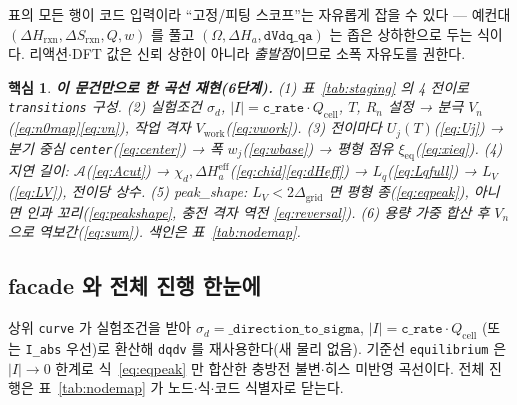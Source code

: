 \documentclass[11pt,a4paper]{article}
\newtheorem*{keybox}{핵심}
\newcommand{\eff}{\mathrm{eff}}
\newcommand{\eq}{\mathrm{eq}}
\newcommand{\cell}{\mathrm{cell}}
\newcommand{\rxn}{\mathrm{rxn}}
\newcommand{\work}{\mathrm{work}}
\newcommand{\code}[1]{\texttt{#1}}
\begin{document}
표의 모든 행이 코드 입력이라 ``고정/피팅 스코프''는 자유롭게 잡을 수 있다 --- 예컨대 $(\Delta H_\rxn,\Delta S_\rxn,Q,w)$ 를
풀고 $(\Omega,\Delta H_a,\code{dVdq\_qa})$ 는 좁은 상하한으로 두는 식이다. 리액션$\cdot$DFT 값은 신뢰 상한이 아니라
\emph{출발점}이므로 소폭 자유도를 권한다.

\begin{keybox}
\textbf{이 문건만으로 한 곡선 재현(6단계).}
(1) 표~\ref{tab:staging} 의 4 전이로 \code{transitions} 구성.
(2) 실험조건 $\sigma_d$, $|I|=\code{c\_rate}\cdot Q_\cell$, $T$, $R_n$ 설정 → 분극 $V_n$(\eqref{eq:n0map}\eqref{eq:vn}), 작업 격자 $V_\work$(\eqref{eq:vwork}).
(3) 전이마다 $U_j(T)$(\eqref{eq:Uj}) → 분기 중심 \code{center}(\eqref{eq:center}) → 폭 $w_j$(\eqref{eq:wbase}) → 평형 점유 $\xi_\eq$(\eqref{eq:xieq}).
(4) 지연 길이: $\mathcal A$(\eqref{eq:Acut}) → $\chi_d,\Delta H_a^\eff$(\eqref{eq:chid}\eqref{eq:dHeff}) → $L_q$(\eqref{eq:Lqfull}) → $L_V$(\eqref{eq:LV}), 전이당 상수.
(5) peak\_shape: $L_V<2\Delta_\mathrm{grid}$ 면 평형 종(\eqref{eq:eqpeak}), 아니면 인과 꼬리(\eqref{eq:peakshape}, 충전 격자 역전 \eqref{eq:reversal}).
(6) 용량 가중 합산 후 $V_n$ 으로 역보간(\eqref{eq:sum}). 색인은 표~\ref{tab:nodemap}.
\end{keybox}

\subsection{facade 와 전체 진행 한눈에}
상위 \code{curve} 가 실험조건을 받아 $\sigma_d=\code{\_direction\_to\_sigma}$, $|I|=\code{c\_rate}\cdot Q_\cell$
(또는 \code{I\_abs} 우선)로 환산해 \code{dqdv} 를 재사용한다(새 물리 없음). 기준선 \code{equilibrium} 은
$|I|\to0$ 한계로 식~\eqref{eq:eqpeak} 만 합산한 충방전 불변$\cdot$히스 미반영 곡선이다. 전체 진행은 표~\ref{tab:nodemap}
가 노드$\cdot$식$\cdot$코드 식별자로 닫는다.
\end{document}
